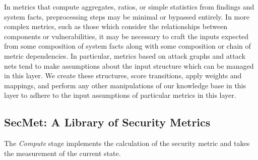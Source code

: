 In metrics that compute aggregates, ratios, or simple statistics from findings and system facts, preprocessing steps may be minimal or bypassed entirely. In more complex metrics, such as those which consider the relationships between components or vulnerabilities, it may be necessary to craft the inputs expected from some composition of system facts along with some composition or chain of metric dependencies. In particular, metrics based on attack graphs and attack nets tend to make assumptions about the input structure which can be managed in this layer. We create these structures, score transitions, apply weights and mappings, and perform any other manipulations of our knowledge base in this layer to adhere to the input assumptions of particular metrics in this layer. 




\subsection{SecMet: A Library of Security Metrics} \label{sec:automation:methodology:compute}

The \textit{Compute} stage implements the calculation of the security metric and takes the measurement of the current state. 



 

